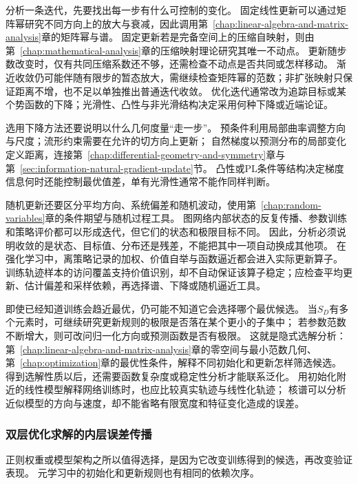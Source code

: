 分析一条迭代，先要找出每一步有什么可控制的变化。
固定线性更新可以通过矩阵幂研究不同方向上的放大与衰减，因此调用第~\ref{chap:linear-algebra-and-matrix-analysis}章的矩阵幂与谱。
固定更新若是完备空间上的压缩自映射，则由第~\ref{chap:mathematical-analysis}章的压缩映射理论研究其唯一不动点。
更新随步数改变时，仅有共同压缩系数还不够，还需检查不动点是否共同或怎样移动。
渐近收敛仍可能伴随有限步的暂态放大，需继续检查矩阵幂的范数；非扩张映射只保证距离不增，也不足以单独推出普通迭代收敛。
优化迭代通常改为追踪目标或某个势函数的下降；光滑性、凸性与非光滑结构决定采用何种下降或近端论证。

选用下降方法还要说明以什么几何度量“走一步”。
预条件利用局部曲率调整方向与尺度；流形约束需要在允许的切方向上更新；
自然梯度以预测分布的局部变化定义距离，连接第~\ref{chap:differential-geometry-and-symmetry}章与第~\ref{sec:information-natural-gradient-update}节。
凸性或PL条件等结构决定梯度信息何时还能控制最优值差，单有光滑性通常不能作同样判断。

随机更新还要区分平均方向、系统偏差和随机波动，使用第~\ref{chap:random-variables}章的条件期望与随机过程工具。
图网络内部状态的反复传播、参数训练和策略评价都可以形成迭代，但它们的状态和极限目标不同。
因此，分析必须说明收敛的是状态、目标值、分布还是残差，不能把其中一项自动换成其他项。
在强化学习中，离策略记录的加权、价值自举与函数逼近都会进入实际更新算子。
训练轨迹样本的访问覆盖支持价值识别，却不自动保证该算子稳定；应检查平均更新、估计偏差和采样依赖，再选择谱、下降或随机逼近工具。

即使已经知道训练会趋近最优，仍可能不知道它会选择哪个最优候选。
当$S_D$有多个元素时，可继续研究更新规则的极限是否落在某个更小的子集中；
若参数范数不断增大，则可改问归一化方向或预测函数是否有极限。
这就是隐式选解分析：第~\ref{chap:linear-algebra-and-matrix-analysis}章的零空间与最小范数几何、
第~\ref{chap:optimization}章的最优性条件，解释不同初始化和更新怎样筛选候选。
得到选解性质以后，还需要函数复杂度或稳定性分析才能联系泛化。
用初始化附近的线性模型解释网络训练时，也应比较真实轨迹与线性化轨迹；
核谱可以分析近似模型的方向与速度，却不能省略有限宽度和特征变化造成的误差。

\subsubsection{双层优化求解的内层误差传播}
\label{sec:future-analysis-nested-learning}

正则权重或模型架构之所以值得选择，是因为它改变训练得到的候选，再改变验证表现。
元学习中的初始化和更新规则也有相同的依赖次序。

